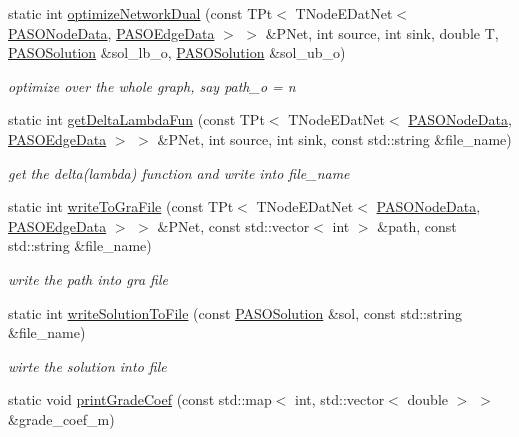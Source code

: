 \begin{DoxyCompactItemize}
static int \hyperlink{class_p_a_s_o_util_a598dc61bd2d496e38838990dfd7e9280}{optimize\+Network\+Dual} (const T\+Pt$<$ T\+Node\+E\+Dat\+Net$<$ \hyperlink{class_p_a_s_o_node_data}{P\+A\+S\+O\+Node\+Data}, \hyperlink{class_p_a_s_o_edge_data}{P\+A\+S\+O\+Edge\+Data} $>$ $>$ \&P\+Net, int source, int sink, double T, \hyperlink{class_p_a_s_o_solution}{P\+A\+S\+O\+Solution} \&sol\+\_\+lb\+\_\+o, \hyperlink{class_p_a_s_o_solution}{P\+A\+S\+O\+Solution} \&sol\+\_\+ub\+\_\+o)
\begin{DoxyCompactList}\small\item\em optimize over the whole graph, say path\+\_\+o = n \end{DoxyCompactList}\item 
static int \hyperlink{class_p_a_s_o_util_a561b5b1b2d951e3a00e2db0d9df29584}{get\+Delta\+Lambda\+Fun} (const T\+Pt$<$ T\+Node\+E\+Dat\+Net$<$ \hyperlink{class_p_a_s_o_node_data}{P\+A\+S\+O\+Node\+Data}, \hyperlink{class_p_a_s_o_edge_data}{P\+A\+S\+O\+Edge\+Data} $>$ $>$ \&P\+Net, int source, int sink, const std\+::string \&file\+\_\+name)
\begin{DoxyCompactList}\small\item\em get the delta(lambda) function and write into file\+\_\+name \end{DoxyCompactList}\item 
static int \hyperlink{class_p_a_s_o_util_a2857dc7bc68196273db263275001e671}{write\+To\+Gra\+File} (const T\+Pt$<$ T\+Node\+E\+Dat\+Net$<$ \hyperlink{class_p_a_s_o_node_data}{P\+A\+S\+O\+Node\+Data}, \hyperlink{class_p_a_s_o_edge_data}{P\+A\+S\+O\+Edge\+Data} $>$ $>$ \&P\+Net, const std\+::vector$<$ int $>$ \&path, const std\+::string \&file\+\_\+name)
\begin{DoxyCompactList}\small\item\em write the path into gra file \end{DoxyCompactList}\item 
\hypertarget{class_p_a_s_o_util_a93f9c2736dbde7516599f9c901186b55}{}static int \hyperlink{class_p_a_s_o_util_a93f9c2736dbde7516599f9c901186b55}{write\+Solution\+To\+File} (const \hyperlink{class_p_a_s_o_solution}{P\+A\+S\+O\+Solution} \&sol, const std\+::string \&file\+\_\+name)\label{class_p_a_s_o_util_a93f9c2736dbde7516599f9c901186b55}

\begin{DoxyCompactList}\small\item\em wirte the solution into file \end{DoxyCompactList}\item 
\hypertarget{class_p_a_s_o_util_ad46cbb0090d1e406ac8264f4c5a72cbf}{}static void \hyperlink{class_p_a_s_o_util_ad46cbb0090d1e406ac8264f4c5a72cbf}{print\+Grade\+Coef} (const std\+::map$<$ int, std\+::vector$<$ double $>$ $>$ \&grade\+\_\+coef\+\_\+m)\label{class_p_a_s_o_util_ad46cbb0090d1e406ac8264f4c5a72cbf}


\end{DoxyCompactItemize}
